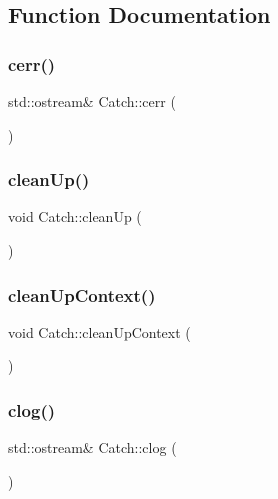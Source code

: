 \subsection{Function Documentation}
\mbox{\label{namespace_catch_a4e5b5dc07abdfa30de33593dfab71f43}} 
\subsubsection{\texorpdfstring{cerr()}{cerr()}}
{\footnotesize\ttfamily std\+::ostream\& Catch\+::cerr (\begin{DoxyParamCaption}{ }\end{DoxyParamCaption})}

\mbox{\label{namespace_catch_a0f78e9afdebc6d4512d18e76fbf54b8c}} 
\subsubsection{\texorpdfstring{clean\+Up()}{cleanUp()}}
{\footnotesize\ttfamily void Catch\+::clean\+Up (\begin{DoxyParamCaption}{ }\end{DoxyParamCaption})}

\mbox{\label{namespace_catch_ae50508f10ffc4ed873a31a4db4caea16}} 
\subsubsection{\texorpdfstring{clean\+Up\+Context()}{cleanUpContext()}}
{\footnotesize\ttfamily void Catch\+::clean\+Up\+Context (\begin{DoxyParamCaption}{ }\end{DoxyParamCaption})}

\mbox{\label{namespace_catch_a5a0677089050dcdb4848f56fb47e9279}} 
\subsubsection{\texorpdfstring{clog()}{clog()}}
{\footnotesize\ttfamily std\+::ostream\& Catch\+::clog (\begin{DoxyParamCaption}{ }\end{DoxyParamCaption})}

